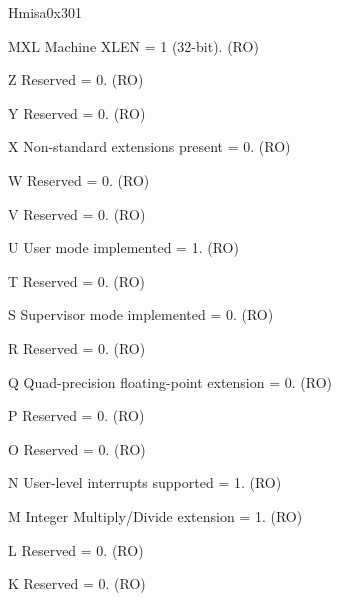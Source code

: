 \begin{register}{H}{misa}{0x301}\label{regdesc:MISA}
%
%
%
%
%
%
%
%
%
%
%
%
%
%
%
%
%
%
%
%
%
%
%
%
%
%
%
%
\regnewline%
\begin{regdesc}\begin{reglist}
\label{fielddesc:MISAMXL}\item [MXL] Machine XLEN = 1 (32-bit). (RO)
\label{fielddesc:MISAZ}\item [Z] Reserved = 0. (RO)
\label{fielddesc:MISAY}\item [Y] Reserved = 0. (RO)
\label{fielddesc:MISAX}\item [X] Non-standard extensions present = 0. (RO)
\label{fielddesc:MISAW}\item [W] Reserved = 0. (RO)
\label{fielddesc:MISAV}\item [V] Reserved = 0. (RO)
\label{fielddesc:MISAU}\item [U] User mode implemented = 1. (RO)
\label{fielddesc:MISAT}\item [T] Reserved = 0. (RO)
\label{fielddesc:MISAS}\item [S] Supervisor mode implemented = 0. (RO)
\label{fielddesc:MISAR}\item [R] Reserved = 0. (RO)
\label{fielddesc:MISAQ}\item [Q] Quad-precision floating-point extension = 0. (RO)
\label{fielddesc:MISAP}\item [P] Reserved = 0. (RO)
\label{fielddesc:MISAO}\item [O] Reserved = 0. (RO)
\label{fielddesc:MISAN}\item [N] User-level interrupts supported = 1. (RO)
\label{fielddesc:MISAM}\item [M] Integer Multiply/Divide extension = 1. (RO)
\label{fielddesc:MISAL}\item [L] Reserved = 0. (RO)
\label{fielddesc:MISAK}\item [K] Reserved = 0. (RO)

\end{reglist}
\end{regdesc}
\end{register}
